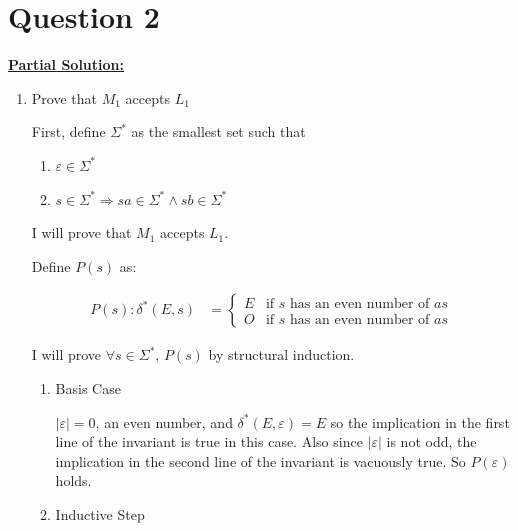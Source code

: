 \documentclass[12pt]{article}
\begin{document}
\bigskip

\section*{Question 2}

\bigskip

\setcounter{equation}{0}
\underline{\textbf{Partial Solution:}}

\bigskip

\begin{enumerate}[1.]
    \item Prove that $M_1$ accepts $L_1$

    \bigskip

    First, define $\Sigma^*$ as the smallest set such that
    \begin{enumerate}
        \item $\varepsilon \in \Sigma^*$
        \item $s \in \Sigma^* \Rightarrow sa \in \Sigma^* \land sb \in \Sigma^*$
    \end{enumerate}

    \bigskip

    I will prove that $M_1$ accepts $L_1$.

    \bigskip

    Define $P(s)$ as:

    \begin{align}
        P(s):\delta^*(E,s) &= \begin{cases}
            E & \text{if $s$ has an even number of $as$}\\
            O & \text{if $s$ has an even number of $as$}
        \end{cases}
    \end{align}

    I will prove $\forall s \in \Sigma^*$, $P(s)$ by structural induction.

    \begin{enumerate}[1.]
        \item Basis Case

        \bigskip

        $\vert \varepsilon \vert = 0$, an even number, and $\delta^*(E,\varepsilon) = E$
        so the implication in the first line of the invariant is true in this case.
        Also since $\vert \varepsilon \vert$ is not odd, the implication in the second
        line of the invariant is vacuously true. So $P(\varepsilon)$ holds.

        \item Inductive Step


\end{enumerate}
\end{enumerate}
\end{document}

